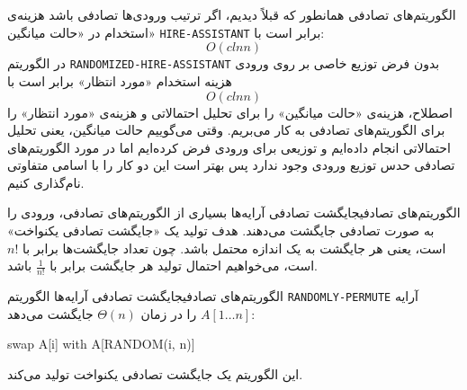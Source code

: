 \begin{itemframe}{الگوریتم‌های تصادفی}
\itm
همانطور که قبلاً دیدیم، اگر ترتیب ورودی‌ها‌ تصادفی باشد هزینه‌ی استخدام در «حالت میانگین»
\texttt{HIRE-ASSISTANT}
برابر است با:
$$O(clnn)$$
\itm
در الگوریتم
\texttt{RANDOMIZED-HIRE-ASSISTANT}
بدون فرض توزیع خاصی بر روی ورودی هزینه استخدام «مورد انتظار» برابر است با
$$O(clnn)$$
\itm
اصطلاح، هزینه‌ی «حالت میانگین» را برای تحلیل احتمالاتی و هزینه‌ی «مورد انتظار» را برای الگوریتم‌های تصادفی به کار می‌بریم. وقتی می‌گوییم حالت میانگین، یعنی تحلیل احتمالاتی انجام داده‌ایم و توزیعی برای ورودی فرض کرده‌ایم اما در مورد الگوریتم‌های تصادفی حدس توزیع ورودی وجود ندارد پس بهتر است این دو کار را با اسامی متفاوتی نام‌گذاری کنیم.
\end{itemframe}


\begin{itemframe-s}{الگوریتم‌های تصادفی}{جایگشت تصادفی آرایه‌ها}
\itm
بسیاری از الگوریتم‌های تصادفی، ورودی را به صورت تصادفی جایگشت می‌دهند.
هدف تولید یک «جایگشت تصادفی یکنواخت»
است، یعنی هر جایگشت به یک اندازه محتمل باشد.
\itm
چون تعداد جایگشت‌ها برابر با $n!$ است، می‌خواهیم احتمال تولید هر جایگشت برابر با
$\frac{1}{n!}$
باشد.
\end{itemframe-s}


\begin{itemframe-s}{الگوریتم‌های تصادفی}{جایگشت تصادفی آرایه‌ها}
\itm
الگوریتم
\texttt{RANDOMLY-PERMUTE}
 آرایه
$A[1 \dots n]$
را در زمان
$\Theta(n)$
جایگشت می‌دهد:
\begin{algorithm}[H]\alglr
\caption{RANDOMLY-PERMUTE}
\begin{algorithmic}[1]
    \State swap A[i] with A[RANDOM(i, n)]
  \EndFor
\EndProcedure
\end{algorithmic}
\end{algorithm}

\itm
این الگوریتم یک جایگشت تصادفی یکنواخت تولید می‌کند.
\end{itemframe-s}